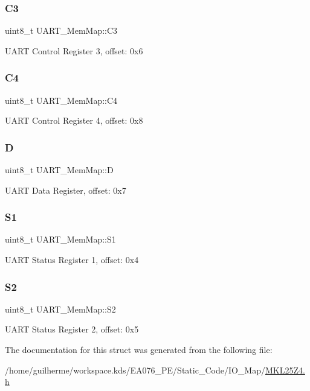 \subsubsection{\texorpdfstring{C3}{C3}}
{\footnotesize\ttfamily uint8\+\_\+t U\+A\+R\+T\+\_\+\+Mem\+Map\+::\+C3}

U\+A\+RT Control Register 3, offset\+: 0x6 \mbox{\label{struct_u_a_r_t___mem_map_a6f18d698404d3f130cab66610aa526de}} 
\subsubsection{\texorpdfstring{C4}{C4}}
{\footnotesize\ttfamily uint8\+\_\+t U\+A\+R\+T\+\_\+\+Mem\+Map\+::\+C4}

U\+A\+RT Control Register 4, offset\+: 0x8 \mbox{\label{struct_u_a_r_t___mem_map_a3568c1640bf7dc0e1214cddcea1e8f0c}} 
\subsubsection{\texorpdfstring{D}{D}}
{\footnotesize\ttfamily uint8\+\_\+t U\+A\+R\+T\+\_\+\+Mem\+Map\+::D}

U\+A\+RT Data Register, offset\+: 0x7 \mbox{\label{struct_u_a_r_t___mem_map_a7eb8df4e43194dbd9f1d9bd4ab742cca}} 
\subsubsection{\texorpdfstring{S1}{S1}}
{\footnotesize\ttfamily uint8\+\_\+t U\+A\+R\+T\+\_\+\+Mem\+Map\+::\+S1}

U\+A\+RT Status Register 1, offset\+: 0x4 \mbox{\label{struct_u_a_r_t___mem_map_a6107c55f4dba727e1a4e70f76acd7b20}} 
\subsubsection{\texorpdfstring{S2}{S2}}
{\footnotesize\ttfamily uint8\+\_\+t U\+A\+R\+T\+\_\+\+Mem\+Map\+::\+S2}

U\+A\+RT Status Register 2, offset\+: 0x5 

The documentation for this struct was generated from the following file\+:\begin{DoxyCompactItemize}
\item 
/home/guilherme/workspace.\+kds/\+E\+A076\+\_\+\+P\+E/\+Static\+\_\+\+Code/\+I\+O\+\_\+\+Map/\hyperlink{_m_k_l25_z4_8h}{M\+K\+L25\+Z4.\+h}\end{DoxyCompactItemize}
